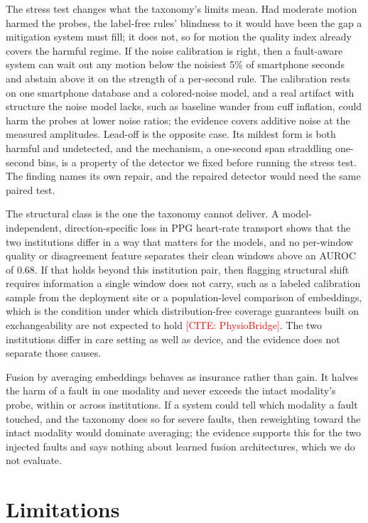 \documentclass[pmlr,twocolumn,10pt]{jmlr}
\newcommand{\placeholder}[1]{\textcolor{red}{[#1]}}
\begin{document}
The stress test changes what the taxonomy's limits mean. Had moderate motion harmed the probes, the label-free rules' blindness to it would have been the gap a mitigation system must fill; it does not, so for motion the quality index already covers the harmful regime. If the noise calibration is right, then a fault-aware system can wait out any motion below the noisiest 5\% of smartphone seconds and abstain above it on the strength of a per-second rule. The calibration rests on one smartphone database and a colored-noise model, and a real artifact with structure the noise model lacks, such as baseline wander from cuff inflation, could harm the probes at lower noise ratios; the evidence covers additive noise at the measured amplitudes. Lead-off is the opposite case. Its mildest form is both harmful and undetected, and the mechanism, a one-second span straddling one-second bins, is a property of the detector we fixed before running the stress test. The finding names its own repair, and the repaired detector would need the same paired test.

The structural class is the one the taxonomy cannot deliver. A model-independent, direction-specific loss in PPG heart-rate transport shows that the two institutions differ in a way that matters for the models, and no per-window quality or disagreement feature separates their clean windows above an AUROC of 0.68. If that holds beyond this institution pair, then flagging structural shift requires information a single window does not carry, such as a labeled calibration sample from the deployment site or a population-level comparison of embeddings, which is the condition under which distribution-free coverage guarantees built on exchangeability are not expected to hold \placeholder{CITE: PhysioBridge}. The two institutions differ in care setting as well as device, and the evidence does not separate those causes.

Fusion by averaging embeddings behaves as insurance rather than gain. It halves the harm of a fault in one modality and never exceeds the intact modality's probe, within or across institutions. If a system could tell which modality a fault touched, and the taxonomy does so for severe faults, then reweighting toward the intact modality would dominate averaging; the evidence supports this for the two injected faults and says nothing about learned fusion architectures, which we do not evaluate.

\section{Limitations}
\label{sec:limits}
\end{document}
